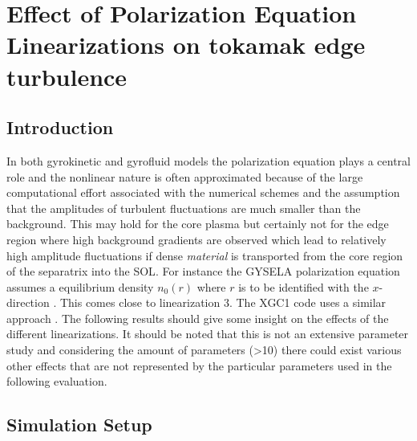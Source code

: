 \documentclass[master.tex]{subfiles}
\begin{document}
\chapter{Effect of Polarization Equation Linearizations on tokamak edge turbulence}\label{sec:polarization_equation_evaluation}

\section{Introduction}
In both gyrokinetic and gyrofluid models the polarization equation plays a central role and the nonlinear nature is often approximated because of the large computational effort associated with the numerical schemes and the assumption that the amplitudes of turbulent fluctuations are much smaller than the background. This may hold for the core plasma but certainly not for the edge region where high background gradients are observed which lead to relatively high amplitude fluctuations if dense \textit{material} is transported from the core region of the separatrix into the \ac{SOL}. For instance the GYSELA polarization equation assumes a equilibrium density $n_0(r)$ where $r$ is to be identified with the $x$-direction \cite{GYSELACODE}. This comes close to linearization 3. The XGC1 code uses a similar approach \cite{XGC1Code}. The following results should give some insight on the effects of the different linearizations. It should be noted that this is not an extensive parameter study and considering the amount of parameters (>10) there could exist various other effects that are not represented by the particular parameters used in the following evaluation.


\section{Simulation Setup}
\end{document}
